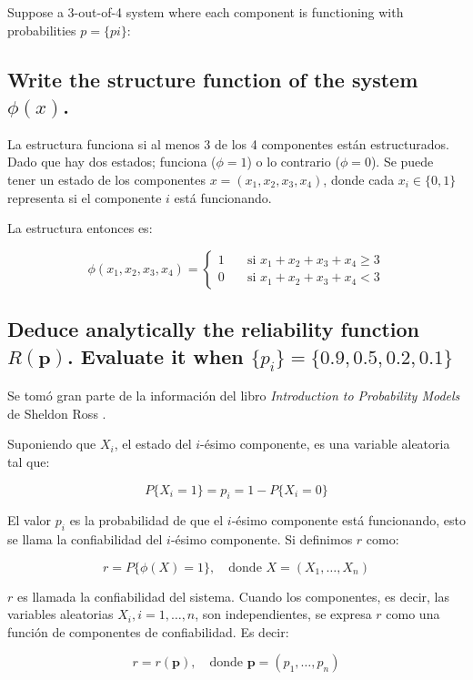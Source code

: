 \documentclass[12pt]{article}\usepackage[]{graphicx}\usepackage[]{xcolor}
\begin{document}
Suppose a 3-out-of-4 system where each component is functioning with probabilities $p = \{pi\}$:


\subsection{Write the structure function of the system $\phi(x)$.}

La estructura funciona si al menos 3 de los 4 componentes están estructurados. Dado que hay dos estados; funciona ($\phi = 1$) o lo contrario ($\phi = 0$). Se puede tener un estado de los componentes $x = (x_{1}, x_{2}, x_{3}, x_{4})$, donde cada $x_{i} \in \{0, 1 \}$ representa si el componente $i$ está funcionando.

La estructura entonces es:

\[
\phi (x_{1}, x_{2}, x_{3}, x_{4}) =
\begin{cases}
  1 & \quad \text{si } x_{1} + x_{2} + x_{3} + x_{4} \geq 3 \\
  0 & \quad \text{si } x_{1} + x_{2} + x_{3} + x_{4} < 3
\end{cases}
\]

\subsection{Deduce analytically the reliability function $R(\mathbf{p})$. Evaluate it when $\{p_{i} \} = \{0.9, 0.5, 0.2, 0.1\} $}

Se tomó gran parte de la información del libro \textit{Introduction to Probability Models} de Sheldon Ross \cite{ross2014introduction}.


Suponiendo que $X_{i}$, el estado del $i$-ésimo componente, es una variable aleatoria tal que:

\[
P\{X_{i} = 1 \} = p_{i} = 1 - P\{X_{i} = 0 \}
\]

El valor $p_{i}$ es la probabilidad de que el $i$-ésimo componente está funcionando, esto se llama la confiabilidad del $i$-ésimo componente. Si definimos $r$ como:

\[
r = P\{\phi (X) = 1 \}, \quad \text{donde } X = (X_{1}, \dots, X_{n})
\]

$r$ es llamada la confiabilidad del sistema. Cuando los componentes, es decir, las variables aleatorias $X_{i}, i = 1, \dots, n$, son independientes, se expresa $r$ como una función de componentes de confiabilidad. Es decir:

\[
r = r (\mathbf{p}), \quad \text{donde } \mathbf{p} = (p_{1}, \dots, p_{n})
\]
\end{document}
